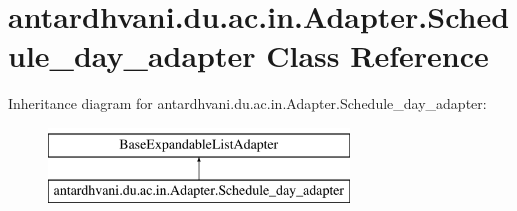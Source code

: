 \hypertarget{classantardhvani_1_1du_1_1ac_1_1in_1_1_adapter_1_1_schedule__day__adapter}{}\section{antardhvani.\+du.\+ac.\+in.\+Adapter.\+Schedule\+\_\+day\+\_\+adapter Class Reference}
\label{classantardhvani_1_1du_1_1ac_1_1in_1_1_adapter_1_1_schedule__day__adapter}
Inheritance diagram for antardhvani.\+du.\+ac.\+in.\+Adapter.\+Schedule\+\_\+day\+\_\+adapter\+:\begin{figure}[H]
\begin{center}
\leavevmode
\includegraphics[height=2.000000cm]{classantardhvani_1_1du_1_1ac_1_1in_1_1_adapter_1_1_schedule__day__adapter}
\end{center}
\end{figure}
